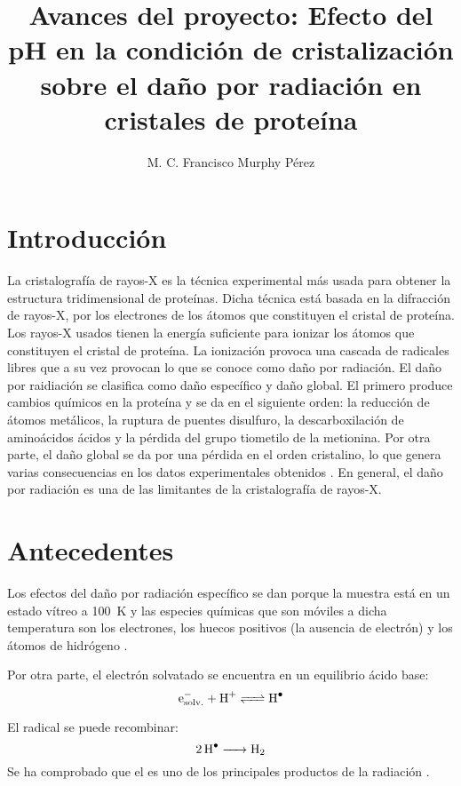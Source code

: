 \documentclass[11pt,letterpaper]{article}
\author{M. C. Francisco Murphy Pérez}
\title{Avances del proyecto: Efecto del pH en la condición de
cristalización sobre el daño por radiación
en cristales de proteína}
\begin{document}
\maketitle
\section{Introducción}	
La cristalografía de rayos-X es la técnica experimental más usada para obtener la estructura tridimensional de proteínas. Dicha técnica está basada en la difracción de rayos-X, por los electrones de los átomos que constituyen el cristal de proteína. Los rayos-X usados tienen la energía suficiente para ionizar los átomos que constituyen el cristal de proteína. La ionización provoca una cascada de radicales libres que a su vez provocan lo que se conoce como daño por radiación. El daño por raidiación se clasifica como daño específico y daño global. El primero produce cambios químicos en la proteína y se da en el siguiente orden: la reducción de átomos metálicos, la ruptura de puentes disulfuro, la descarboxilación de aminoácidos ácidos y la pérdida del grupo tiometilo de la metionina. Por otra parte, el daño global se da por una pérdida en el orden cristalino, lo que genera varias consecuencias en los datos experimentales obtenidos \cite{Weik2000,Ravelli2000}. En general, el daño por radiación es una de las limitantes de la cristalografía de rayos-X.
	
\section{Antecedentes}
Los efectos del daño por radiación específico se dan porque la muestra está en un estado vítreo a \SI{100}{\kelvin} y las especies químicas que son móviles a dicha temperatura son los electrones, los huecos positivos (la ausencia de electrón) y los átomos de hidrógeno \cite{Owen2012a}. 
	
Por otra parte, el electrón solvatado se encuentra en un equilibrio ácido base:
\begin{equation*}
\ce{e^{-}_{solv.} + H^{+} <=> H^{.}}
\end{equation*}

El radical  se puede recombinar:
\begin{equation*}
\ce{2H^{.}      ->        H2}
\end{equation*} 
Se ha comprobado que el  es uno de los principales productos de la radiación \cite{Meents2010}.
	
\end{document}
